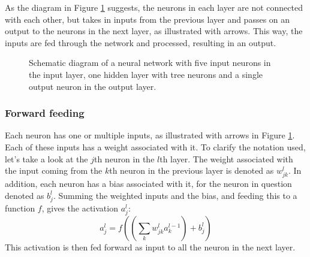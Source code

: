 As the diagram in Figure \ref{fig:NNstructure} suggests, the neurons in each layer are not connected with each other, but takes in inputs from the previous layer and passes on an output to the neurons in the next layer, as illustrated with arrows. This way, the inputs are fed through the network and processed, resulting in an output.
\begin{figure}[htbp]
	\centering
	\caption{Schematic diagram of a neural network with five input neurons in the input layer, one hidden layer with tree neurons and a single output neuron in the output layer.}
	\label{fig:NNstructure}
\end{figure}

\subsubsection*{Forward feeding}
Each neuron has one or multiple inputs, as illustrated with arrows in Figure \ref{fig:NNstructure}. Each of these inputs has a weight associated with it. To clarify the notation used, let's take a look at the $j$th neuron in the $l$th layer. The weight associated with the input coming from the $k$th neuron in the previous layer is denoted as $w^l_{jk}$. In addition, each neuron has a bias associated with it, for the neuron in question denoted as $b^l_j$. Summing the weighted inputs and the bias, and feeding this to a function $f$, gives the activation $a^l_j$:
\begin{equation*}
	a^l_j = f\left(\left(\sum_{k}w^l_{jk}a^{l-1}_k\right) + b^l_j\right)
\end{equation*}
This activation is then fed forward as input to all the neuron in the next layer.

